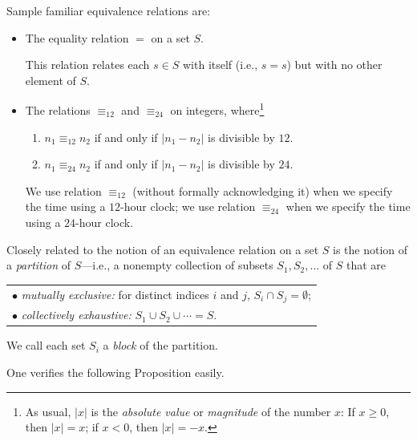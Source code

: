 \noindent
Sample familiar  equivalence relations are:
\begin{itemize}
\item
The equality relation $=$ on a set $S$.

\smallskip

This relation relates each $s \in S$ with itself (i.e., $s=s$) but with no other element of $S$.

\medskip\item
The relations $\equiv_{12}$ and $\equiv_{24}$ on integers, where\footnote{As usual, $|x|$ is the {\em absolute value} or {\em magnitude} of the number $x$: If $x \geq 0$, then $|x| = x$; if $x < 0$, then $|x| = -x$.}
  \begin{enumerate}
  \item
$n_1 \equiv_{12} n_2$ if and only if $|n_1 - n_2|$ is divisible by $12$.
  \medskip\item
$n_1 \equiv_{24} n_2$ if and only if $|n_1 - n_2|$ is divisible by $24$.
  \end{enumerate}

\smallskip

We use relation $\equiv_{12}$ (without formally acknowledging it) when we specify the time using a $12$-hour clock; we use relation $\equiv_{24}$ when we specify the time using a $24$-hour clock.
\end{itemize}

\smallskip

 

\noindent
Closely related to the notion of an equivalence relation on a set $S$ is the notion of a {\it partition} of $S$---i.e., a nonempty collection of subsets $S_1, S_2, \ldots$ of $S$ that are

\smallskip

\begin{tabular}{l}
$\bullet$ {\em mutually exclusive:}
for distinct indices $i$ and $j$, $S_i \cap S_j = \emptyset$; \\
$\bullet$ {\em collectively exhaustive:}
$S_1 \cup S_2 \cup \cdots = S$.
\end{tabular}

\smallskip

\noindent
We call each set $S_i$ a {\it block} of the partition. 
 

\noindent
One verifies the following Proposition easily.

